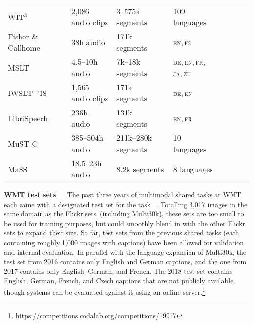 \documentclass{svjour3}
\newcommand{\element}[1]{\noindent\textbf{#1} ~~}
\newcommand{\tedtrans}{IWSLT~’18}
\newcommand{\tick}{\checkmark}
\begin{document}
\begin{table}[t]
\begin{tabular}{@{}llllcccc@{}}
WIT$^3$~\citep{cettolo-wit3:-2012}                     & 2,086 audio clips   & 3--575k segments    & 109 languages                   & \tick & & \\
            Fisher \& Callhome~\citep{post-improved-2013}          & 38h audio      & 171k segments       & \textsc{en,\,es}                & \tick & & \\
            MSLT~\citep{federmann-microsoft-2017}                  & 4.5--10h audio & 7k--18k segments    & \textsc{de,\,en,\,fr,\,ja,\,zh} & \tick & & \\
            \tedtrans{}~\citep{niehues-iwslt-2018}                 & 1,565 audio clips   & 171k segments       & \textsc{de,\,en}                & \tick & & \\
            LibriSpeech~\citep{kocabiyikoglu-librispeech-slt-2018} & 236h audio     & 131k segments       & \textsc{en,\,fr}                & \tick & & \\
            MuST-C~\citep{gangi-mustc-2019}                        & 385--504h audio    & 211k--280k segments & 10 languages                    & \tick & & \\
            MaSS~\citep{boito-mass-2019}                           & 18.5--23h audio     & 8.2k segments       & 8 languages                     & \tick & & \\
            


\bottomrule
        \end{tabular}
    \end{table}
    
  












        \element{WMT test sets}
            The past three years of multimodal shared tasks at WMT each came with a designated test set for the task ~\citep{specia-shared-2016, elliott-findings-2017, barrault-findings-2018}. Totalling 3,017 images in the same domain as the Flickr sets~(including Multi30k), these sets are too small to be used for training purposes, but could smoothly blend in with the other Flickr sets to expand their size. So far, test sets from the previous shared tasks (each containing roughly 1,000 images with captions) have been allowed for validation and internal evaluation. In parallel with the language expansion of Multi30k, the test set from 2016 contains only English and German captions, and the one from 2017 contains only English, German, and French. The 2018 test set contains English, German, French, and Czech captions that are not publicly available, though systems can be evaluated against it using an online server.\footnote{\url{https://competitions.codalab.org/competitions/19917}}\\
        
\end{document}
